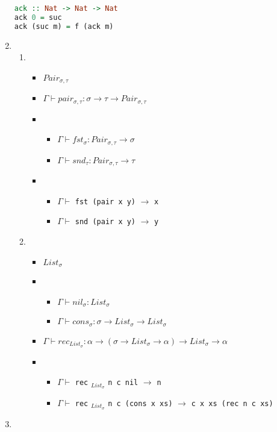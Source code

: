 \documentclass[12pt,a4paper]{article}
\begin{document}
\begin{enumerate}
{\begin{enumerate}
{\begin{lstlisting}[language=Haskell]
ack :: Nat -> Nat -> Nat
ack 0 = suc
ack (suc m) = f (ack m)
			\end{lstlisting}
		}
	\end{enumerate}
}
\item {
	\begin{enumerate}
	\item {
		\begin{itemize}
			\item $Pair_{\sigma,\tau}$
			\item $\Gamma \vdash pair_{\sigma,\tau} \colon \sigma \rightarrow \tau \rightarrow Pair_{\sigma,\tau}$
			\item {
				\begin{itemize}
					\item $\Gamma \vdash fst_{\sigma} \colon Pair_{\sigma,\tau} \rightarrow \sigma$
					\item $\Gamma \vdash snd_{\tau} \colon Pair_{\sigma,\tau} \rightarrow \tau$
				\end{itemize}
			}
			\item {
				\begin{itemize}
					\item $\Gamma \vdash$ \texttt{fst (pair x y)} $\rightarrow$ \texttt{x}
					\item $\Gamma \vdash$ \texttt{snd (pair x y)} $\rightarrow$ \texttt{y}
				\end{itemize}
			}
		\end{itemize}
	}
	\item {
		\begin{itemize}
			\item $List_{\sigma}$
			\item {
				\begin{itemize}
					\item $\Gamma \vdash nil_{\sigma} \colon List_{\sigma}$
					\item $\Gamma \vdash cons_{\sigma} \colon \sigma \rightarrow List_{\sigma} \rightarrow List_{\sigma}$
				\end{itemize}
			}
			\item $\Gamma \vdash rec_{List_{\sigma}} \colon \alpha \rightarrow (\sigma \rightarrow List_{\sigma} \rightarrow \alpha) \rightarrow List_{\sigma} \rightarrow \alpha$
			\item {
				\begin{itemize}
					\item $\Gamma \vdash$ \texttt{rec} $_{List_{\sigma}}$ \texttt{n c nil} $\rightarrow$ \texttt{n}
					\item $\Gamma \vdash$ \texttt{rec} $_{List_{\sigma}}$ \texttt{n c (cons x xs)} $\rightarrow$ \texttt{c x xs (rec n c xs)}
				\end{itemize}
			}
		\end{itemize}
	}
	\end{enumerate}
}
\item 
\end{enumerate}
\end{document}
